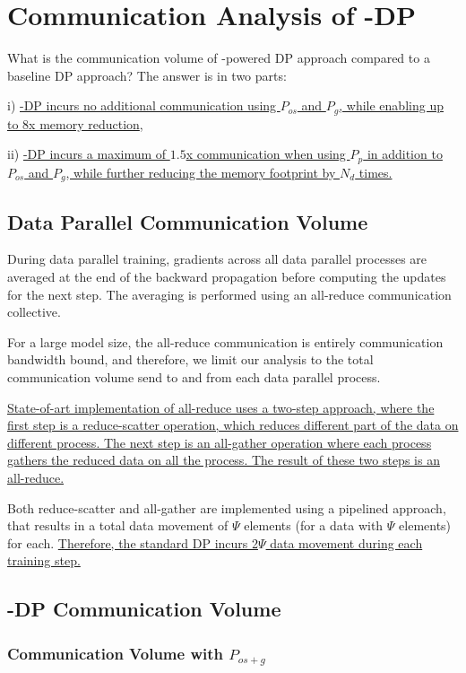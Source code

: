 \section{Communication Analysis of \name-DP}\label{sec:communication}

What is the communication volume of \name-powered DP approach compared to a baseline DP approach?
The answer is in two parts:

i) \uline{\name-DP incurs no additional communication using $P_{os}$ and $P_g$, while enabling up to 8x memory reduction},

ii) \uline{\name-DP incurs a maximum of $1.5$x communication when using $P_p$ in addition to $P_{os}$ and $P_{g}$, while further reducing the memory footprint by $N_d$ times.}

\subsection{Data Parallel Communication Volume}

During data parallel training, gradients across all data parallel processes are averaged at the end of the backward propagation before computing the updates for the next step. The averaging is performed using an all-reduce communication collective.

For a large model size, the all-reduce communication is entirely communication bandwidth bound, and therefore, we limit our analysis to the total communication volume send to and from each data parallel process.

\uline{State-of-art implementation of all-reduce uses a two-step approach, where the first step is a reduce-scatter operation, which reduces different part of the data on different process. The next step is an all-gather operation where each process gathers the reduced data on all the process. The result of these two steps is an all-reduce.}

Both reduce-scatter and all-gather are implemented using a pipelined approach, that results in a total data movement of $\Psi$ elements (for a data with $\Psi$ elements) for each. \uline{Therefore, the standard DP incurs 2$\Psi$ data movement during each training step.}

\subsection{\name-DP Communication Volume}
\subsubsection{Communication Volume with $P_{os+g}$}

